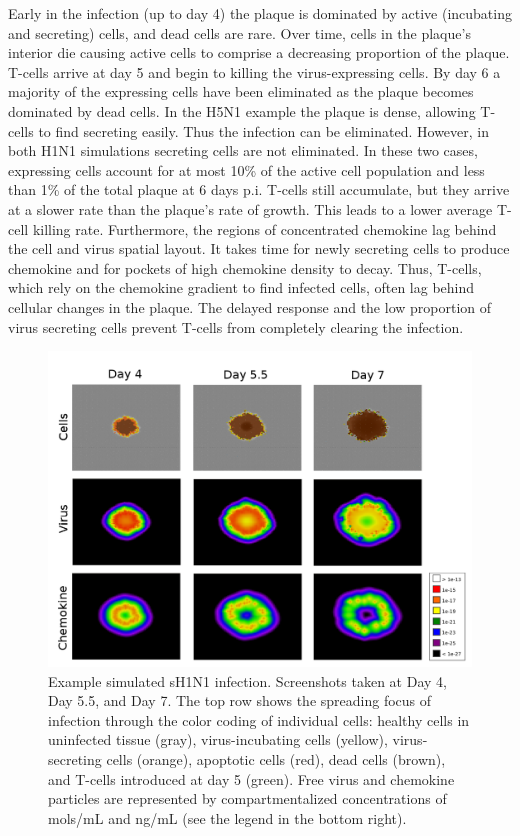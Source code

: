 \documentclass[10pt]{article}
\begin{document}
Early in the infection (up to day 4) the plaque is dominated by active (incubating and secreting) cells, and dead cells are rare. Over time, cells in the plaque's interior die causing active cells to comprise a decreasing proportion of the plaque. T-cells arrive at day 5 and begin to killing the virus-expressing cells. By day 6 a majority of the expressing cells have been eliminated as the plaque becomes dominated by dead cells.  In the H5N1 example the plaque is dense, allowing T-cells to find secreting easily.  Thus the infection can be eliminated.  However, in both H1N1 simulations secreting cells are not eliminated.  In these two cases, expressing cells account for at most 10\% of the active cell population and less than  1\% of the total plaque at 6 days p.i.  T-cells still accumulate, but they arrive at a slower rate than the plaque's rate of growth. This leads to a lower average T-cell killing rate.  Furthermore, the regions of concentrated chemokine lag behind the cell and virus spatial layout.  It takes time for newly secreting cells to produce chemokine and for pockets of high chemokine density to decay.  Thus, T-cells, which rely on the chemokine gradient to find infected cells, often lag behind cellular changes in the plaque.  The delayed response and the low proportion of virus secreting cells prevent T-cells from completely clearing the infection.

\begin{figure}[ht!]
\begin{center}
 \includegraphics[width=\textwidth]{cycells}
 \end{center}
\caption{Example simulated sH1N1 infection. Screenshots taken at Day 4, Day 5.5, and Day 7.  The top row shows the spreading focus of infection  through the color coding of individual cells:  healthy cells in uninfected tissue (gray),  virus-incubating cells (yellow), virus-secreting cells (orange), apoptotic cells (red), dead cells (brown), and T-cells introduced at day 5 (green).  Free virus and chemokine particles are represented by compartmentalized concentrations of mols/mL and ng/mL (see the legend in the bottom right).} 
 \label{fig:cycells}
\end{figure}
\end{document}
